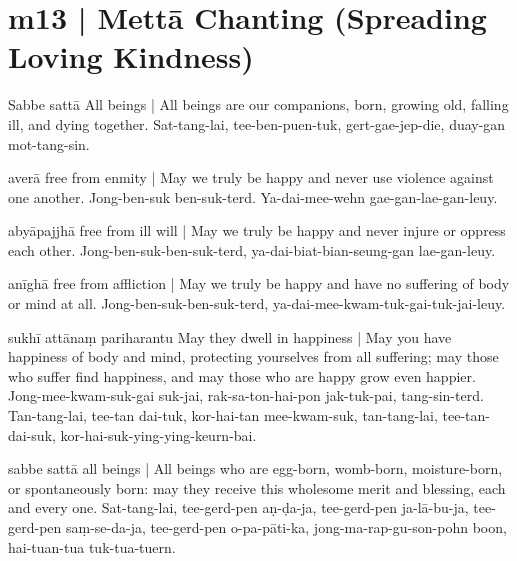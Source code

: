 
\section*{m13 | Mettā Chanting (Spreading Loving Kindness)}\label{sec:m13}

\begin{chantsubsection}
  \chantlineinline
    {Sabbe sattā}
    {All beings | All beings are our companions, born, growing old, falling ill, and dying together.}
  \chantindent
    {Sat-tang-lai, tee-ben-puen-tuk, gert-gae-jep-die, duay-gan mot-tang-sin.}
  \chantgap

  \chantlineinline
    {averā}
    {free from enmity | May we truly be happy and never use violence against one another.}
  \chantindent
    {Jong-ben-suk ben-suk-terd. Ya-dai-mee-wehn gae-gan-lae-gan-leuy.}
  \chantgap

  \chantlineinline
    {abyāpajjhā}
    {free from ill will | May we truly be happy and never injure or oppress each other.}
  \chantindent
    {Jong-ben-suk-ben-suk-terd, ya-dai-biat-bian-seung-gan lae-gan-leuy.}
  \chantgap

  \chantlineinline
    {anīghā}
    {free from affliction | May we truly be happy and have no suffering of body or mind at all.}
  \chantindent
    {Jong-ben-suk-ben-suk-terd, ya-dai-mee-kwam-tuk-gai-tuk-jai-leuy.}
  \chantgap

  \chantlineinline
    {sukhī attānaṃ pariharantu}
    {May they dwell in happiness | May you have happiness of body and mind, protecting yourselves from all suffering; may those who suffer find happiness, and may those who are happy grow even happier.}
  \chantindent
    {Jong-mee-kwam-suk-gai suk-jai, rak-sa-ton-hai-pon jak-tuk-pai, tang-sin-terd.}
  \chantindent
    {Tan-tang-lai, tee-tan dai-tuk, kor-hai-tan mee-kwam-suk, tan-tang-lai, tee-tan-dai-suk, kor-hai-suk-ying-ying-keurn-bai.}
  \chantgap

  \chantlineinline
    {sabbe sattā}
    {all beings | All beings who are egg-born, womb-born, moisture-born, or spontaneously born: may they receive this wholesome merit and blessing, each and every one.}
  \chantindent
    {Sat-tang-lai, tee-gerd-pen aṇ-ḍa-ja, tee-gerd-pen ja-lā-bu-ja, tee-gerd-pen saṃ-se-da-ja, tee-gerd-pen o-pa-pāti-ka, jong-ma-rap-gu-son-pohn boon, hai-tuan-tua tuk-tua-tuern.}
\end{chantsubsection}

